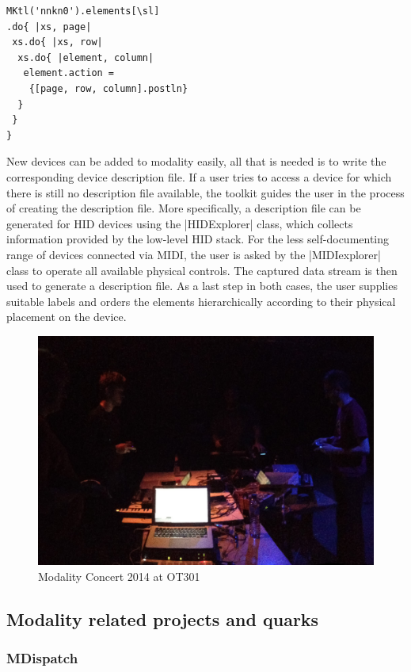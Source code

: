 \documentclass{article}
\begin{document}
\begin{Verbatim}
MKtl('nnkn0').elements[\sl]
.do{ |xs, page|
 xs.do{ |xs, row|
  xs.do{ |element, column|
   element.action = 
    {[page, row, column].postln}
  }
 }
}
\end{Verbatim}

New devices can be added to modality easily, all that is needed is to write the corresponding device description file. 
If a user tries to access a device for which there is still no description file available, the toolkit guides the user in the process of creating the description file. 
More specifically, a description file can be generated for HID devices using the |HIDExplorer| class, which collects information provided by the low-level HID stack. 
For the less self-documenting range of devices connected via MIDI, the user is asked by the |MIDIexplorer| class to operate all available physical controls. 
The captured data stream is then used to generate a description file.
As a last step in both cases, the user supplies suitable labels and orders the elements hierarchically according to their physical placement on the device.




\begin{figure}[h]
	\centering
		\includegraphics[width=.9\columnwidth]{../media/20140405-IMG_1691.jpg}
	\caption{Modality Concert 2014 at OT301}
	\label{fig:media_20140405-IMG_1691}
\end{figure}

\subsection{Modality related projects and quarks} 

	
\subsubsection{MDispatch}	
\end{document}
